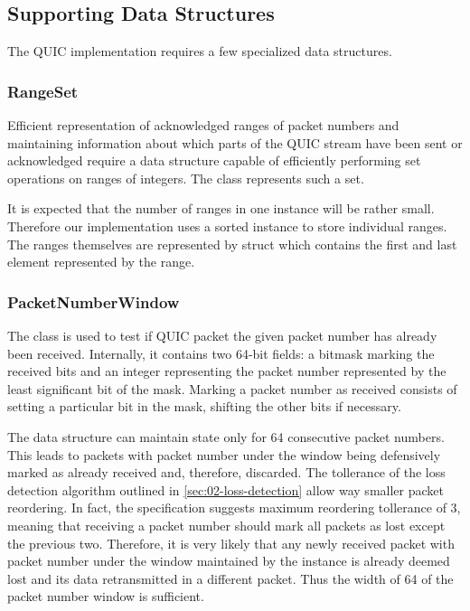 \subsection{Supporting Data Structures}

The QUIC implementation requires a few specialized data structures.


\subsubsection{RangeSet}

Efficient representation of acknowledged ranges of packet numbers and maintaining information about
which parts of the QUIC stream have been sent or acknowledged require a data structure capable of
efficiently performing set operations on ranges of integers. The \RangeSet{} class represents such a
set.

It is expected that the number of ranges in one \RangeSet{} instance will be rather small. Therefore
our implementation uses a sorted  instance to store individual ranges. The ranges
themselves are represented by  struct which contains the first and last
element represented by the range.

\subsubsection{PacketNumberWindow}

The \PacketNumberWindow{} class is used to test if QUIC packet the given packet number has already
been received. Internally, it contains two 64-bit fields: a bitmask marking the received bits and an
integer representing the packet number represented by the least significant bit of the mask. Marking
a packet number as received consists of setting a particular bit in the mask, shifting the other
bits if necessary. 

The data structure can maintain state only for 64 consecutive packet numbers. This leads to packets
with packet number under the window being defensively marked as already received and, therefore,
discarded. The tollerance of the loss detection algorithm outlined in
\autoref{sec:02-loss-detection} allow way smaller packet reordering. In fact, the specification
suggests maximum reordering tollerance of 3, meaning that receiving a packet number should mark all
packets as lost except the previous two. Therefore, it is very likely that any newly received packet
with packet number under the window maintained by the \PacketNumberWindow{} instance is already
deemed lost and its data retransmitted in a different packet. Thus the width of 64 of the packet
number window is sufficient.

